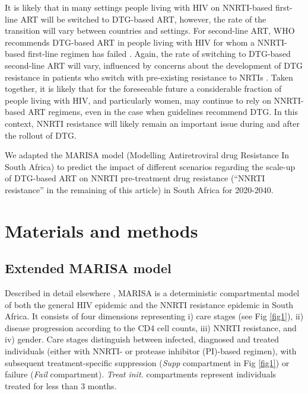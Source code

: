 \documentclass[10pt,letterpaper]{article}
\begin{document}
It is likely that in many settings people living with HIV on NNRTI-based first-line ART will be switched to DTG-based ART, however, the rate of the transition will vary between countries and settings. For second-line ART, WHO recommends DTG-based ART in people living with HIV for whom a NNRTI-based first-line regimen has failed \cite{WHO2019}. Again, the rate of switching to DTG-based second-line ART will vary, influenced by concerns about the development of DTG resistance in patients who switch with pre-existing resistance to NRTIs \cite{Inzaule2019}. Taken together, it is likely that for the foreseeable  future a considerable fraction of people living with HIV, and particularly women, may continue to rely on NNRTI-based ART regimens, even in the case when guidelines recommend DTG. In this context, NNRTI resistance will likely remain an important issue during and after the rollout of DTG. 

We adapted the MARISA model (Modelling Antiretroviral drug Resistance In South Africa) \cite{Hauser2019} to predict the impact of different scenarios regarding the scale-up of DTG-based ART on NNRTI pre-treatment drug resistance (“NNRTI resistance” in the remaining of this article) in South Africa for 2020-2040.

\section*{Materials and methods}
\subsection*{Extended MARISA model}
Described in detail elsewhere \cite{Hauser2019}, MARISA is a deterministic compartmental model of both the general HIV epidemic and the NNRTI resistance epidemic in South Africa. It consists of four dimensions representing i) care stages (see Fig \ref{fig1}), ii) disease progression according to the CD4 cell counts, iii) NNRTI resistance, and iv) gender. Care stages distinguish between infected, diagnosed and treated individuals (either with NNRTI- or protease inhibitor (PI)-based regimen), with subsequent treatment-specific suppression (\textit{Supp} compartment in Fig \ref{fig1}) or failure (\textit{Fail} compartment). \textit{Treat init.} compartments represent individuals treated for less than 3 months.
\end{document}
